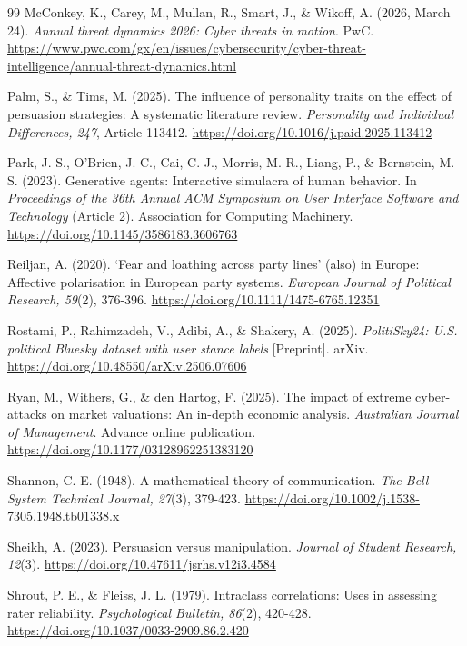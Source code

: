 \documentclass[11pt,a4paper]{article}
\newcommand{\doiurl}[1]{\href{https://doi.org/#1}{https://doi.org/#1}}
\begin{document}
\begin{thebibliography}{99}
McConkey, K., Carey, M., Mullan, R., Smart, J., \& Wikoff, A. (2026, March 24). \textit{Annual
threat dynamics 2026: Cyber threats in motion}. PwC.
\url{https://www.pwc.com/gx/en/issues/cybersecurity/cyber-threat-intelligence/annual-threat-dynamics.html}

Palm, S., \& Tims, M. (2025). The influence of personality traits on the effect of persuasion
strategies: A systematic literature review. \textit{Personality and Individual Differences, 247},
Article 113412. \doiurl{10.1016/j.paid.2025.113412}

Park, J. S., O'Brien, J. C., Cai, C. J., Morris, M. R., Liang, P., \& Bernstein, M. S. (2023).
Generative agents: Interactive simulacra of human behavior. In \textit{Proceedings of the 36th
Annual ACM Symposium on User Interface Software and Technology} (Article 2). Association for
Computing Machinery. \doiurl{10.1145/3586183.3606763}

Reiljan, A. (2020). `Fear and loathing across party lines' (also) in Europe: Affective
polarisation in European party systems. \textit{European Journal of Political Research, 59}(2),
376-396. \doiurl{10.1111/1475-6765.12351}

Rostami, P., Rahimzadeh, V., Adibi, A., \& Shakery, A. (2025). \textit{PolitiSky24: U.S.
political Bluesky dataset with user stance labels} [Preprint]. arXiv.
\doiurl{10.48550/arXiv.2506.07606}

Ryan, M., Withers, G., \& den Hartog, F. (2025). The impact of extreme cyber-attacks on market
valuations: An in-depth economic analysis. \textit{Australian Journal of Management}. Advance
online publication. \doiurl{10.1177/03128962251383120}

Shannon, C. E. (1948). A mathematical theory of communication. \textit{The Bell System Technical
Journal, 27}(3), 379-423. \doiurl{10.1002/j.1538-7305.1948.tb01338.x}

Sheikh, A. (2023). Persuasion versus manipulation. \textit{Journal of Student Research, 12}(3).
\doiurl{10.47611/jsrhs.v12i3.4584}

Shrout, P. E., \& Fleiss, J. L. (1979). Intraclass correlations: Uses in assessing rater
reliability. \textit{Psychological Bulletin, 86}(2), 420-428.
\doiurl{10.1037/0033-2909.86.2.420}


\end{thebibliography}
\end{document}
